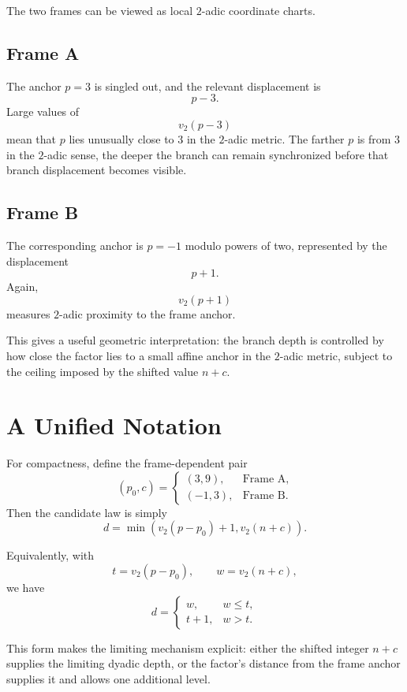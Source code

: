 \documentclass[11pt,a4paper]{article}
\newcommand{\vTwo}{v_2}
\begin{document}
The two frames can be viewed as local $2$-adic coordinate charts.

\subsection{Frame A}

The anchor $p=3$ is singled out, and the relevant displacement is
\[
    p-3.
\]
Large values of
\[
    \vTwo(p-3)
\]
mean that $p$ lies unusually close to $3$ in the $2$-adic metric. The farther $p$ is from $3$ in the $2$-adic sense, the deeper the branch can remain synchronized before that branch displacement becomes visible.

\subsection{Frame B}

The corresponding anchor is $p=-1$ modulo powers of two, represented by the displacement
\[
    p+1.
\]
Again,
\[
    \vTwo(p+1)
\]
measures $2$-adic proximity to the frame anchor.

This gives a useful geometric interpretation: the branch depth is controlled by how close the factor lies to a small affine anchor in the $2$-adic metric, subject to the ceiling imposed by the shifted value $n+c$.

\section{A Unified Notation}

For compactness, define the frame-dependent pair
\[
    (p_0,c)=
    \begin{cases}
        (3,9), & \text{Frame A},\\
        (-1,3), & \text{Frame B}.
    \end{cases}
\]
Then the candidate law is simply
\[
    \boxed{
    d=
    \min\left(
        \vTwo(p-p_0)+1,
        \vTwo(n+c)
    \right).
    }
\]

Equivalently, with
\[
    t=\vTwo(p-p_0),
    \qquad
    w=\vTwo(n+c),
\]
we have
\[
    d=
    \begin{cases}
        w, & w\le t,\\
        t+1, & w>t.
    \end{cases}
\]

This form makes the limiting mechanism explicit: either the shifted integer $n+c$ supplies the limiting dyadic depth, or the factor's distance from the frame anchor supplies it and allows one additional level.
\end{document}
